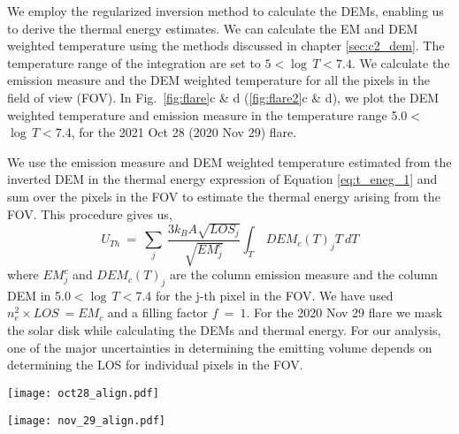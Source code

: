 We employ the regularized inversion method \citep{hannah&kontar12} to calculate the DEMs, enabling us to derive the thermal energy estimates. We can calculate the EM and DEM weighted temperature using the methods discussed in chapter \ref{sec:c2_dem}. The temperature range of the integration are set to $5 < \log\,T < 7.4$. We calculate the emission measure and the DEM weighted temperature for all the pixels in the field of view (FOV). In Fig.~\ref{fig:flare}c \& d (\ref{fig:flare2}c \& d), we plot the DEM weighted temperature and emission measure in the temperature range 5.0$<$$\log\,T$$<$7.4, for the 2021 Oct 28 (2020 Nov 29) flare.

We use the emission measure and DEM weighted temperature estimated from the inverted DEM in the thermal energy expression of Equation \ref{eq:t_eneg_1} and sum over the pixels in the FOV to estimate the thermal energy arising from the FOV. This procedure gives us,
\begin{equation}
    U_{Th}~=~\sum_{j}~\frac{3k_{B}A\sqrt{LOS_{j}}}{\sqrt{EM^{c}_{j}}}\int_{T}~DEM_{c}(T)_{j}T~dT
    \label{eq:t_eneg}
\end{equation}
where $EM^{c}_{j}$ and $DEM_{c}(T)_{j}$ are the column emission measure and the column DEM in 5.0$<$$\log\,T$$<$7.4 for the j-th pixel in the FOV. We have used $n_{e}^{2}\times LOS~=EM_{c}$ and a filling factor $\textit{f}~=~1$. For the 2020 Nov 29 flare we mask the solar disk while calculating the DEMs and thermal energy. For our analysis, one of the major uncertainties in determining the emitting volume depends on determining the LOS for individual pixels in the FOV.

\begin{figure*}[ht!]
    \texttt{[image: oct28\_align.pdf]}
    \caption{Panel (a): the flare arcade in AIA 193 {\AA}. Panel (b): STIX soft X-ray contours (4 {--} 16 keV, solid pink lines) and hard X-ray contours (16 {--} 50 keV, solid blue lines) aligned to AIA 1600 {\AA} and over plotted. Panel (c): the emission measure map of the region for $5~<log(T)~<7.4$. Panel (d): the DEM weighted temperature map of the region.}
    \label{fig:flare}
\end{figure*}

\begin{figure*}[ht!]
\centering
    \texttt{[image: nov\_29\_align.pdf]}
    \caption{Panel (a): the flare arcade in AIA 131 {\AA}. Panel (b): {\it Hinode}/XRT Be-Med soft X-ray image recorded almost at the same time. Panel (c):  the DEM weighted temperature map of the region for $5~<log(T)~<7.4$. Panel (d): the emission measure map of the region for $5~<log(T)~<7.4$}
    \label{fig:flare2}
\end{figure*}


